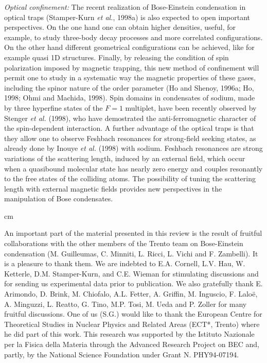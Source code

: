 {\it Optical confinement:} The recent realization of Bose-Einstein
condensation in optical traps (Stamper-Kurn {\it et al.}, 1998a) is 
also expected to open important perspectives.
On the one hand one can obtain higher densities, useful, for example,
to study  three-body decay processes and more correlated configurations.
On the other hand different geometrical configurations can be achieved,
like for example quasi 1D structures. Finally, by releasing the
condition of spin polarization imposed by magnetic trapping, this
new method of confinement will permit one to study in a systematic way
the magnetic properties of these gases, including the spinor nature 
of the order parameter (Ho and Shenoy, 1996a; Ho, 1998; Ohmi and 
Machida, 1998). Spin domains in condensates of sodium, made by three
hyperfine states of the $F=1$ multiplet, have been recently observed 
by Stenger {\it et al.} (1998), who have demostrated the 
anti-ferromagnetic character of the spin-dependent interaction. 
A further advantage of the optical traps is that they allow one 
to observe Feshbach resonances for strong-field seeking 
states, as already done by Inouye {\it et al.} (1998) with sodium.
Feshbach resonances are strong variations of the scattering length,
induced by an external field, which occur when a quasibound molecular 
state has nearly zero energy and couples resonantly to the free
states of the colliding atoms. The possibility of tuning the scattering 
length with external magnetic fields provides new perspectives in the
manipulation of Bose condensates.

 cm 

\acknowledgements

An important part of the material presented in this review is the
result of fruitful collaborations with the other members of the Trento
team on Bose-Einstein condensation (M. Guilleumas, C. Minniti, L. Ricci,
L. Vichi and F. Zambelli).  It is a pleasure to thank them. We are indebted to
E.A. Cornell, L.V. Hau, W. Ketterle, D.M. Stamper-Kurn, and C.E. Wieman
for stimulating discussions and for sending us experimental data prior
to publication.   We also gratefully thank E. Arimondo, D. Brink, M. Chiofalo,
A.L. Fetter, A. Griffin, M. Inguscio, F. Lalo\"e, A. Minguzzi, L. Reatto,
G. Tino,  M.P. Tosi, M. Ueda and P. Zoller for many fruitful discussions.  
One of us  (S.G.) would like to thank the European Centre for Theoretical 
Studies in Nuclear Physics and Related Areas (ECT*, Trento) where he 
did part of this work.  This research was supported by the Istituto 
Nazionale per la Fisica della Materia through the Advanced Research 
Project on BEC and, partly, by the National Science Foundation under 
Grant N. PHY94-07194.

